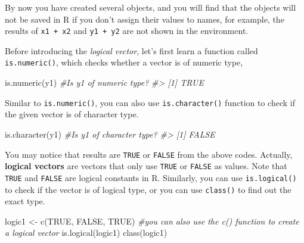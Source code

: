 \documentclass[
]{book}
\newenvironment{Shaded}{\begin{snugshade}}{\end{snugshade}}
\newcommand{\CommentTok}[1]{\textcolor[rgb]{0.56,0.35,0.01}{\textit{#1}}}
\newcommand{\ConstantTok}[1]{\textcolor[rgb]{0.00,0.00,0.00}{#1}}
\newcommand{\FunctionTok}[1]{\textcolor[rgb]{0.00,0.00,0.00}{#1}}
\newcommand{\NormalTok}[1]{#1}
\newcommand{\OtherTok}[1]{\textcolor[rgb]{0.56,0.35,0.01}{#1}}
\newenvironment{blackbox}{
  \definecolor{shadecolor}{rgb}{0, 0, 0}  %
  \color{white}
  \begin{shaded}}
 {\end{shaded}}
\newenvironment{infobox}[1]
  {
  \begin{itemize}
  \renewcommand{\labelitemi}{
    \raisebox{-.7\height}[0pt][0pt]{
      {\setkeys{Gin}{width=3em,keepaspectratio}
        \texttt{[image: pics/\#1]}}
    }
  }
  \setlength{\fboxsep}{1em}
  \begin{blackbox}
  \item
  }
  {
  \end{blackbox}
  \end{itemize}
  }
\begin{document}
\begin{infobox}{caution}
By now you have created several objects, and you will find that the objects will not be saved in R if you don't assign their values to names, for example, the results of \texttt{x1\ +\ x2} and \texttt{y1\ +\ y2} are not shown in the environment.

\end{infobox}

Before introducing the \emph{logical vector}, let's first learn a function called \texttt{is.numeric()}, which checks whether a vector is of numeric type,

\begin{Shaded}
\begin{Highlighting}[]
\FunctionTok{is.numeric}\NormalTok{(y1) }\CommentTok{\#Is y1 of numeric type?}
\CommentTok{\#\textgreater{} [1] TRUE}
\end{Highlighting}
\end{Shaded}

Similar to \texttt{is.numeric()}, you can also use \texttt{is.character()} function to check if the given vector is of character type.

\begin{Shaded}
\begin{Highlighting}[]
\FunctionTok{is.character}\NormalTok{(y1) }\CommentTok{\#Is y1 of character type?}
\CommentTok{\#\textgreater{} [1] FALSE}
\end{Highlighting}
\end{Shaded}

You may notice that results are \texttt{TRUE} or \texttt{FALSE} from the above codes. Actually, \textbf{logical vectors} are vectors that only use \texttt{TRUE} or \texttt{FALSE} as values. Note that \texttt{TRUE} and \texttt{FALSE} are logical constants in R. Similarly, you can use \texttt{is.logical()} to check if the vector is of logical type, or you can use \texttt{class()} to find out the exact type.

\begin{Shaded}
\begin{Highlighting}[]
\NormalTok{logic1 }\OtherTok{\textless{}{-}} \FunctionTok{c}\NormalTok{(}\ConstantTok{TRUE}\NormalTok{, }\ConstantTok{FALSE}\NormalTok{, }\ConstantTok{TRUE}\NormalTok{) }\CommentTok{\#you can also use the c() function to create a logical vector}
\FunctionTok{is.logical}\NormalTok{(logic1)}
\FunctionTok{class}\NormalTok{(logic1)}
\end{Highlighting}
\end{Shaded}
\end{document}
